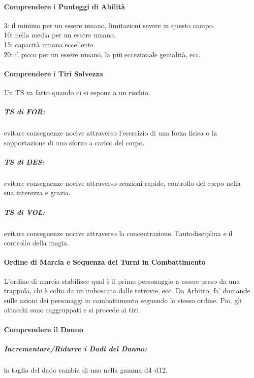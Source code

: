 \documentclass[itdr]{subfiles}
\begin{document}
\vfill

\paragraph{Comprendere i Punteggi di Abilità}
3: il minimo per un essere umano, limitazioni severe in questo campo.\\
10: nella media per un essere umano.\\
15: capacità umana eccellente.\\
20: il picco per un essere umano, la più eccezionale genialità, ecc.

\vfill

\paragraph{Comprendere i Tiri Salvezza}
Un TS va fatto quando ci si espone a un rischio.

\subparagraph{TS di FOR:} evitare conseguenze nocive attraverso l’esercizio di una forza fisica o la sopportazione di uno sforzo a carico del corpo.

\subparagraph{TS di DES:} evitare conseguenze nocive attraverso reazioni rapide, controllo del corpo nella sua interezza e grazia.

\subparagraph{TS di VOL:} evitare conseguenze nocive attraverso la concentrazione, l'autodisciplina e il controllo della magia.

\vfill
\break

\paragraph{Ordine di Marcia e Sequenza dei Turni in Combattimento}
L’ordine di marcia stabilisce qual è il primo personaggio a essere preso da una trappola, chi è colto da un’imboscata dalle retrovie, ecc. Da Arbitro, fa’ domande sulle azioni dei personaggi in combattimento seguendo lo stesso ordine. Poi, gli attacchi sono raggruppati e si procede ai tiri.

\vfill

\paragraph{Comprendere il Danno}
\subparagraph{Incrementare/Ridurre i Dadi del Danno:} la taglia del dado cambia di uno nella gamma d4--d12.
\end{document}
